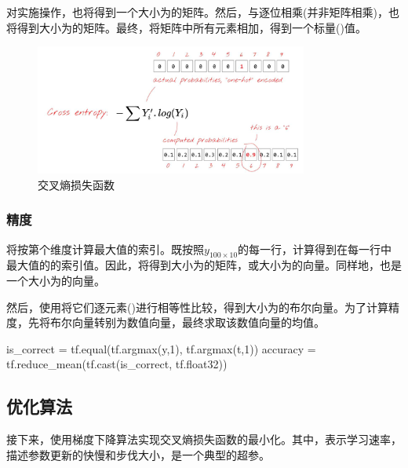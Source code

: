 \begin{content}
对实施操作，也将得到一个大小为\code{[100, 10]}的矩阵。然后，与逐位相乘(并非矩阵相乘)，也将得到大小为\code{[100, 10]}的矩阵。最终，将矩阵中所有元素相加，得到一个标量()值。

\begin{figure}[H]
\centering
\includegraphics[width=0.8\textwidth]{figures/mnist-cross-entropy.png}
\caption{交叉熵损失函数}
 \label{fig:mnist-cross-entropy}
\end{figure}

\subsubsection{精度}

将按第个维度计算最大值的索引。既按照$ y_{100 \times 10} $的每一行，计算得到在每一行中最大值的的索引值。因此，将得到大小为\code{[100, 1]}的矩阵，或大小为的向量。同样地，也是一个大小为的向量。

然后，使用将它们逐元素()进行相等性比较，得到大小为的布尔向量。为了计算精度，先将布尔向量转别为数值向量，最终求取该数值向量的均值。

\begin{leftbar}
\begin{python}
is_correct = tf.equal(tf.argmax(y,1), tf.argmax(t,1))
accuracy = tf.reduce_mean(tf.cast(is_correct, tf.float32))
\end{python}
\end{leftbar}

\subsection{优化算法}

接下来，使用梯度下降算法实现交叉熵损失函数的最小化。其中，表示学习速率，描述参数更新的快慢和步伐大小，是一个典型的超参。


\end{content}
